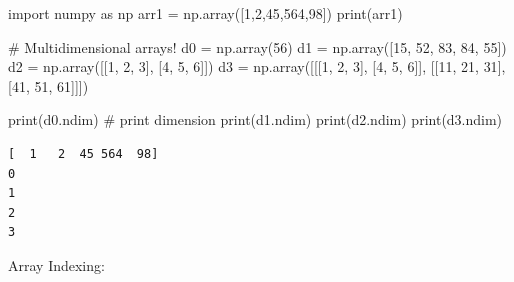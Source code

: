 \documentclass[
  letterpaper,
  DIV=11,
  numbers=noendperiod]{scrreprt}
\newenvironment{Shaded}{\begin{snugshade}}{\end{snugshade}}
\newcommand{\BuiltInTok}[1]{\textcolor[rgb]{0.00,0.23,0.31}{#1}}
\newcommand{\CommentTok}[1]{\textcolor[rgb]{0.37,0.37,0.37}{#1}}
\newcommand{\DecValTok}[1]{\textcolor[rgb]{0.68,0.00,0.00}{#1}}
\newcommand{\ImportTok}[1]{\textcolor[rgb]{0.00,0.46,0.62}{#1}}
\newcommand{\NormalTok}[1]{\textcolor[rgb]{0.00,0.23,0.31}{#1}}
\newcommand{\OperatorTok}[1]{\textcolor[rgb]{0.37,0.37,0.37}{#1}}
\begin{document}
\begin{Shaded}
\begin{Highlighting}[]
\ImportTok{import}\NormalTok{ numpy }\ImportTok{as}\NormalTok{ np}
\NormalTok{arr1 }\OperatorTok{=}\NormalTok{ np.array([}\DecValTok{1}\NormalTok{,}\DecValTok{2}\NormalTok{,}\DecValTok{45}\NormalTok{,}\DecValTok{564}\NormalTok{,}\DecValTok{98}\NormalTok{])}
\BuiltInTok{print}\NormalTok{(arr1)}

\CommentTok{\# Multidimensional arrays!}
\NormalTok{d0 }\OperatorTok{=}\NormalTok{ np.array(}\DecValTok{56}\NormalTok{)}
\NormalTok{d1 }\OperatorTok{=}\NormalTok{ np.array([}\DecValTok{15}\NormalTok{, }\DecValTok{52}\NormalTok{, }\DecValTok{83}\NormalTok{, }\DecValTok{84}\NormalTok{, }\DecValTok{55}\NormalTok{])}
\NormalTok{d2 }\OperatorTok{=}\NormalTok{ np.array([[}\DecValTok{1}\NormalTok{, }\DecValTok{2}\NormalTok{, }\DecValTok{3}\NormalTok{], [}\DecValTok{4}\NormalTok{, }\DecValTok{5}\NormalTok{, }\DecValTok{6}\NormalTok{]])}
\NormalTok{d3 }\OperatorTok{=}\NormalTok{ np.array([[[}\DecValTok{1}\NormalTok{, }\DecValTok{2}\NormalTok{, }\DecValTok{3}\NormalTok{], [}\DecValTok{4}\NormalTok{, }\DecValTok{5}\NormalTok{, }\DecValTok{6}\NormalTok{]], [[}\DecValTok{11}\NormalTok{, }\DecValTok{21}\NormalTok{, }\DecValTok{31}\NormalTok{], [}\DecValTok{41}\NormalTok{, }\DecValTok{51}\NormalTok{, }\DecValTok{61}\NormalTok{]]])}

\BuiltInTok{print}\NormalTok{(d0.ndim) }\CommentTok{\# print dimension}
\BuiltInTok{print}\NormalTok{(d1.ndim)}
\BuiltInTok{print}\NormalTok{(d2.ndim)}
\BuiltInTok{print}\NormalTok{(d3.ndim)}
\end{Highlighting}
\end{Shaded}

\begin{verbatim}
[  1   2  45 564  98]
0
1
2
3
\end{verbatim}

Array Indexing:
\end{document}
